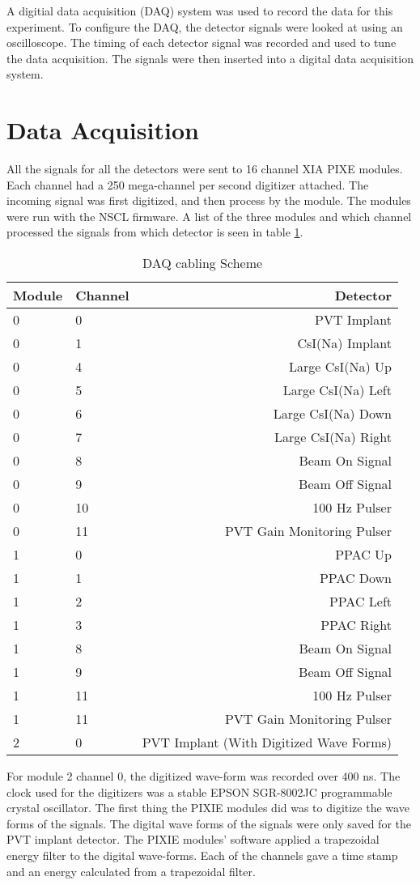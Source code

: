 \documentclass[../MaxHughesThesis.tex]{subfiles}
\begin{document}
A digitial data acquisition (DAQ) system was used to record the data for this experiment.
To configure the DAQ, the detector signals were looked at using an oscilloscope.
The timing of each detector signal was recorded and used to tune the data acquisition. 
The signals were then inserted into a digital data acquisition system.

\section{Data Acquisition}

All the signals for all the detectors were sent to 16 channel XIA PIXE modules. 
Each channel had a 250 mega-channel per second digitizer attached.
The incoming signal was first digitized, and then process by the module. 
The modules were run with the NSCL firmware.
A list of the three modules and which channel processed the signals from which detector is seen in table \ref{tab:cablingscheme}.
%
\begin{table}[!hbt]
	\centering
	\caption{DAQ cabling Scheme}
		\begin{tabular}{llr}
		Module & Channel & Detector \\ \hline
		0 & 0 & PVT Implant \\
		0 & 1 & CsI(Na) Implant \\
		0 & 4 & Large CsI(Na) Up \\
		0 & 5 & Large CsI(Na) Left \\
		0 & 6 & Large CsI(Na) Down \\
		0 & 7 & Large CsI(Na) Right \\
		0 & 8 & Beam On Signal \\
		0 & 9 & Beam Off Signal \\
		0 & 10 & 100 Hz Pulser \\
		0 & 11 & PVT Gain Monitoring Pulser \\
		1 & 0 & PPAC Up \\ 
		1 & 1 & PPAC Down \\ 
		1 & 2 & PPAC Left \\ 
		1 & 3 & PPAC Right \\ 
		1 & 8 & Beam On Signal\\
		1 & 9 & Beam Off Signal\\
		1 & 11 & 100 Hz Pulser \\
		1 & 11 & PVT Gain Monitoring Pulser \\
		2 & 0 & PVT Implant (With Digitized Wave Forms)
		\end{tabular}	
		\label{tab:cablingscheme}
\end{table}
%
For module 2 channel 0, the digitized wave-form was recorded over 400 ns.
The clock used for the digitizers was a stable EPSON SGR-8002JC programmable crystal oscillator.
The first thing the PIXIE modules did was to digitize the wave forms of the signals.
The digital wave forms of the signals were only saved for the PVT implant detector.
The PIXIE modules' software applied a trapezoidal energy filter to the digital wave-forms.
Each of the channels gave a time stamp and an energy calculated from a trapezoidal filter.
\end{document}

